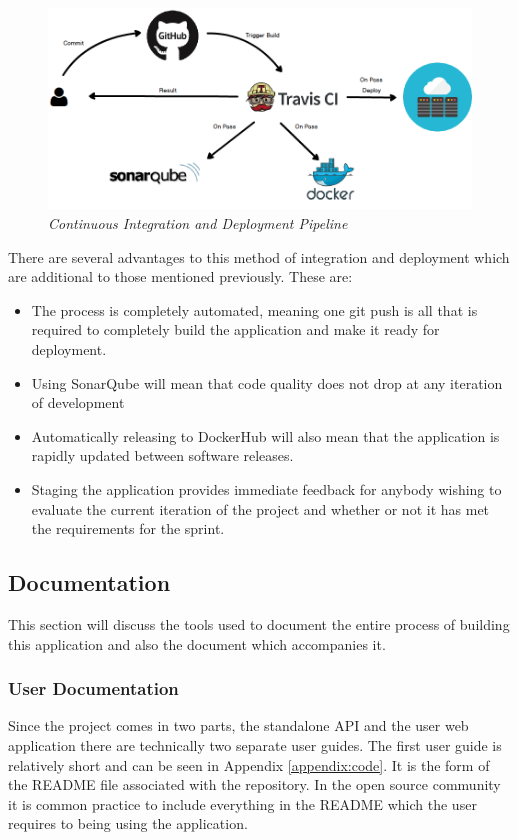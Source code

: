 \begin{figure}[!ht]
\centering
\includegraphics*[width=\textwidth]{images/CI_CD}
\caption{\em Continuous Integration and Deployment Pipeline}
\label{fig:CICD}
\end{figure}

There are several advantages to this method of integration and deployment which are additional to those mentioned previously. These are:

\begin{itemize}
	\item The process is completely automated, meaning one git push is all that is required to completely build the application and make it ready for deployment.
	\item Using SonarQube will mean that code quality does not drop at any iteration of development
	\item Automatically releasing to DockerHub will also mean that the application is rapidly updated between software releases.
	\item Staging the application provides immediate feedback for anybody wishing to evaluate the current iteration of the project and whether or not it has met the requirements for the sprint.
\end{itemize} 

\subsection{Documentation}
This section will discuss the tools used to document the entire process of building this application and also the document which accompanies it.
\subsubsection{User Documentation}
Since the project comes in two parts, the standalone API and the user web application there are technically two separate user guides. The first user guide is relatively short and can be seen in Appendix \ref{appendix:code}. It is the form of the README file associated with the repository. In the open source community it is common practice to include everything in the README which the user requires to being using the application. 

